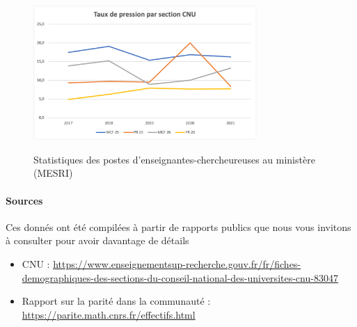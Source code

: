 \begin{figure}[t]
\begin{center}
{\includegraphics[width=8.5cm]{Images/cnu_taux_pression_2021}
}
\end{center}
\caption{Statistiques des postes d'enseignant\mp e\mp s-chercheur\mp euses au minist\`ere (MESRI)}
\label{fig.cnu}
\end{figure}



\paragraph*{Sources} Ces donn\'es ont \'et\'e compil\'ees \`a partir de rapports publics que nous vous invitons \`a consulter pour avoir davantage de d\'etails
\begin{itemize}
\item CNU : 
\url{https://www.enseignementsup-recherche.gouv.fr/fr/fiches-demographiques-des-sections-du-conseil-national-des-universites-cnu-83047}
\item Rapport sur la parit\'e dans la communaut\'e : \url{https://parite.math.cnrs.fr/effectifs.html}
\end{itemize}


